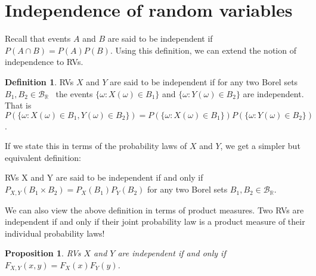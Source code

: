 \documentclass{book}
\theoremstyle{plain}%
\newtheorem{proposition}{Proposition}[section]
\theoremstyle{definition}
\newtheorem{definition}{Definition}[section]
\begin{document}
\section{Independence of random variables}

Recall that events $A$ and $B$ are said to be independent if $P(A \cap B) = P(A)P(B)$. Using this definition, we can extend the notion of independence to RVs.

\begin{definition}
RVs $X$ and $Y$ are said to be independent if for any two Borel sets $B_1, B_2 \in \mathcal{B}_\mathbb{R}$ \ the events $\{\omega: X(\omega) \in B_1\}$ and  $\{\omega: Y(\omega) \in B_2\}$ are independent. That is $P(\{\omega: X(\omega)\in B_1, Y(\omega) \in B_2\}) = P(\{\omega: X(\omega) \in B_1\})P(\{\omega: Y(\omega) \in B_2\})$.

If we state this in terms of the probability laws of $X$ and $Y$, we get a simpler but equivalent definition:

RVs X and Y are said to be independent if and only if $P_{X,Y}(B_1 \times B_2) = P_X(B_1)P_Y(B_2)$ for any two Borel sets $B_1, B_2 \in \mathcal{B}_\mathbb{R}$.
\end{definition}

We can also view the above definition in terms of product measures. Two RVs are independent if and only if their joint probability law is a product measure of their individual probability laws!

\begin{proposition}
RVs $X$ and $Y$ are independent if and only if $F_{X,Y}(x,y) = F_X(x)F_Y(y)$.\label{prop:indep2}
\end{proposition}
\end{document}
